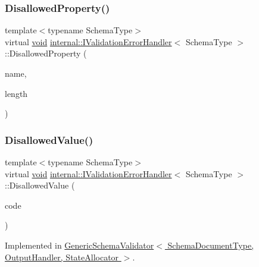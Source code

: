 \subsubsection{\texorpdfstring{Disallowed\+Property()}{DisallowedProperty()}}
{\footnotesize\ttfamily template$<$typename Schema\+Type$>$ \\
virtual \hyperlink{imgui__impl__opengl3__loader_8h_ac668e7cffd9e2e9cfee428b9b2f34fa7}{void} \hyperlink{classinternal_1_1IValidationErrorHandler}{internal\+::\+I\+Validation\+Error\+Handler}$<$ Schema\+Type $>$\+::Disallowed\+Property (\begin{DoxyParamCaption}\item[{const \hyperlink{classinternal_1_1IValidationErrorHandler_a22e6a5f35edb9b614156ad606dcc79d7}{Ch} $\ast$}]{name,  }\item[{\hyperlink{rapidjson_8h_a5ed6e6e67250fadbd041127e6386dcb5}{Size\+Type}}]{length }\end{DoxyParamCaption})\hspace{0.3cm}{\ttfamily [pure virtual]}}

\mbox{\label{classinternal_1_1IValidationErrorHandler_a67531a59c1dd8db20db72b17f0933d03}} 
\subsubsection{\texorpdfstring{Disallowed\+Value()}{DisallowedValue()}}
{\footnotesize\ttfamily template$<$typename Schema\+Type$>$ \\
virtual \hyperlink{imgui__impl__opengl3__loader_8h_ac668e7cffd9e2e9cfee428b9b2f34fa7}{void} \hyperlink{classinternal_1_1IValidationErrorHandler}{internal\+::\+I\+Validation\+Error\+Handler}$<$ Schema\+Type $>$\+::Disallowed\+Value (\begin{DoxyParamCaption}\item[{const \hyperlink{group__RAPIDJSON__ERRORS_ga2e1f88f94a5d9a6817a5de0ed2f0105a}{Validate\+Error\+Code}}]{code }\end{DoxyParamCaption})\hspace{0.3cm}{\ttfamily [pure virtual]}}



Implemented in \hyperlink{classGenericSchemaValidator_afc9082d5e9733762e64df3faa88e0160}{Generic\+Schema\+Validator$<$ Schema\+Document\+Type, Output\+Handler, State\+Allocator $>$}.

